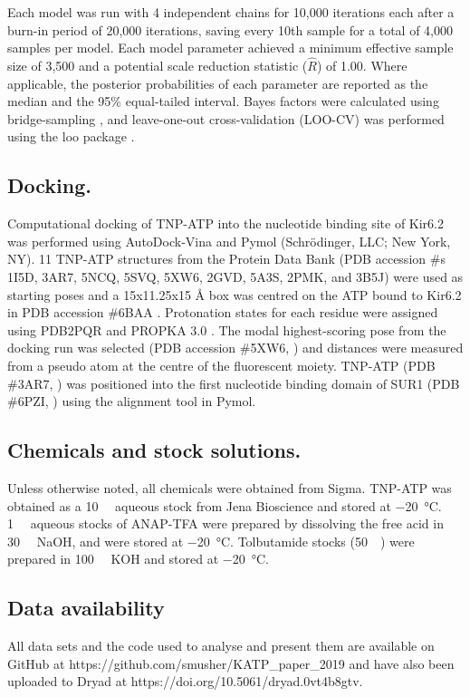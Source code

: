 \documentclass[10pt,lineno, doublespacing]{elife_modified}
\begin{document}
Each model was run with 4 independent chains for 10,000 iterations each after a burn-in period of 20,000 iterations, saving every 10th sample for a total of 4,000 samples per model.
Each model parameter achieved a minimum effective sample size of 3,500 and a potential scale reduction statistic ($\hat{R}$) of 1.00.
Where applicable, the posterior probabilities of each parameter are reported as the median and the 95\% equal-tailed interval.
Bayes factors were calculated using bridge-sampling \citep{RN104}, and leave-one-out cross-validation (LOO-CV) was performed using the loo package \citep{RN110}.

\subsection{Docking.}
Computational docking of TNP-ATP into the nucleotide binding site of Kir6.2 was performed using AutoDock-Vina \citep{RN118} and Pymol (Schrödinger, LLC; New York, NY).
11 TNP-ATP structures from the Protein Data Bank (PDB accession \#s 1I5D, 3AR7, 5NCQ, 5SVQ, 5XW6, 2GVD, 5A3S, 2PMK, and 3B5J) were used as starting poses and a 15x11.25x15 \si{\angstrom} box was centred on the ATP bound to Kir6.2 in PDB accession \#6BAA \citep{RN6}.
Protonation states for each residue were assigned using PDB2PQR and PROPKA 3.0 \citep{RN111}.
The modal highest-scoring pose from the docking run was selected (PDB accession \#5XW6, \cite{RN112}) and distances were measured from a pseudo atom at the centre of the fluorescent moiety.
TNP-ATP (PDB \#3AR7, \cite{RN53}) was positioned into the first nucleotide binding domain of SUR1 (PDB \#6PZI, \cite{RN113}) using the alignment tool in Pymol.

\subsection{Chemicals and stock solutions.}
Unless otherwise noted, all chemicals were obtained from Sigma.
TNP-ATP was obtained as a \SI{10}{\milli\Molar} aqueous stock from Jena Bioscience and stored at \SI{-20}{\degreeCelsius}. \SI{1}{\milli\Molar} aqueous stocks of ANAP-TFA were prepared by dissolving the free acid in \SI{30}{\milli\Molar} NaOH, and were stored at \SI{-20}{\degreeCelsius}. Tolbutamide stocks (\SI{50}{\milli\Molar}) were prepared in \SI{100}{\milli\Molar} KOH and stored at \SI{-20}{\degreeCelsius}.

\subsection{Data availability}
All data sets and the code used to analyse and present them are available on GitHub at \textcolor{elife-blue}{https://github.com/smusher/KATP\_paper\_2019} and have also been uploaded to Dryad at \textcolor{elife-blue}{https://doi.org/10.5061/dryad.0vt4b8gtv}.
\end{document}
